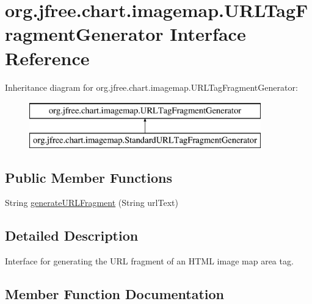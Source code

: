\hypertarget{interfaceorg_1_1jfree_1_1chart_1_1imagemap_1_1_u_r_l_tag_fragment_generator}{}\section{org.\+jfree.\+chart.\+imagemap.\+U\+R\+L\+Tag\+Fragment\+Generator Interface Reference}
\label{interfaceorg_1_1jfree_1_1chart_1_1imagemap_1_1_u_r_l_tag_fragment_generator}
Inheritance diagram for org.\+jfree.\+chart.\+imagemap.\+U\+R\+L\+Tag\+Fragment\+Generator\+:\begin{figure}[H]
\begin{center}
\leavevmode
\includegraphics[height=2.000000cm]{interfaceorg_1_1jfree_1_1chart_1_1imagemap_1_1_u_r_l_tag_fragment_generator}
\end{center}
\end{figure}
\subsection*{Public Member Functions}
\begin{DoxyCompactItemize}
\item 
String \mbox{\hyperlink{interfaceorg_1_1jfree_1_1chart_1_1imagemap_1_1_u_r_l_tag_fragment_generator_aa69913b2f18cfa63c5641c0b10cb66bc}{generate\+U\+R\+L\+Fragment}} (String url\+Text)
\end{DoxyCompactItemize}


\subsection{Detailed Description}
Interface for generating the U\+RL fragment of an H\+T\+ML image map area tag. 

\subsection{Member Function Documentation}
\mbox{\label{interfaceorg_1_1jfree_1_1chart_1_1imagemap_1_1_u_r_l_tag_fragment_generator_aa69913b2f18cfa63c5641c0b10cb66bc}} 

